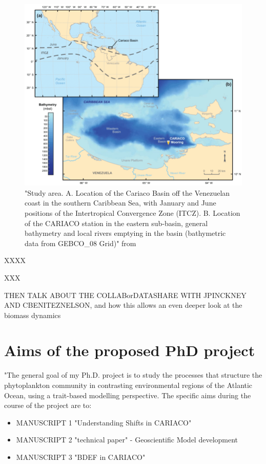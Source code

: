 \begin{figure}
\centering
\includegraphics[trim = 0mm 0mm 0mm 0mm, clip, width=1.\linewidth]{./Chp1-Intro/CARIACObasinMAP_Bringueetal2018.png}
\caption[Scheme]{\small {"Study area. A. Location of the Cariaco Basin off the Venezuelan coast in the southern Caribbean Sea, with January and June positions of the Intertropical Convergence Zone (ITCZ). B. Location of the CARIACO station in the eastern sub-basin, general bathymetry and local rivers emptying in the basin (bathymetric data from GEBCO\_08 Grid)" from \cite{Bringue2019}}}
\label{CARIACO-map}
\end{figure}

XXXX

XXX

THEN TALK ABOUT THE COLLABorDATASHARE WITH JPINCKNEY AND CBENITEZNELSON, and how this allows an even deeper look at the biomass dynamics


\section{Aims of the proposed PhD project}
"The general goal of my Ph.D. project is to study the processes that structure the phytoplankton community in contrasting environmental regions of the Atlantic Ocean, using a trait-based modelling perspective. The specific aims during the course of the project are to:

\begin{itemize}
\item MANUSCRIPT 1 "Understanding Shifts in CARIACO"
\item MANUSCRIPT 2 "technical paper" - Geoscientific Model development
\item MANUSCRIPT 3 "BDEF in CARIACO"
\end{itemize}
